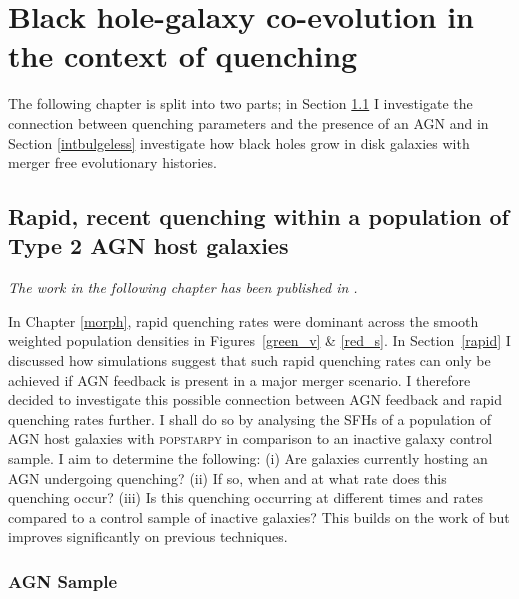 
\chapter{Black hole-galaxy co-evolution in the context of quenching}\label{agnfeedback}

The following chapter is split into two parts; in Section \ref{agnfeedback} I investigate the connection between quenching parameters and the presence of an AGN and in Section \ref{intbulgeless} investigate how black holes grow in disk galaxies with merger free evolutionary histories. 

\section{Rapid, recent quenching within a population of Type 2 AGN host galaxies}\label{agnfeedback}

\emph{The work in the following chapter has been published in \citet{smethurst16}.}

In Chapter \ref{morph}, rapid quenching rates were dominant across the smooth weighted population densities in Figures~\ref{green_v} \& \ref{red_s}. In Section~\ref{rapid} I discussed how simulations suggest that such rapid quenching rates can only be achieved if AGN feedback is present in a major merger scenario. I therefore decided to investigate this possible connection between AGN feedback and rapid quenching rates further. I shall do so by analysing the SFHs of a population of AGN host galaxies with \textsc{popstarpy} in comparison to an inactive galaxy control sample. I  aim to determine the following: (i) Are galaxies currently hosting an AGN undergoing quenching? (ii) If so, when and at what rate does this quenching occur? (iii) Is this quenching occurring at different times and rates compared to a control sample of inactive galaxies? This builds on the work of \citet{Martin07} but improves significantly on previous techniques.

\subsection{AGN Sample}\label{agnsample}

